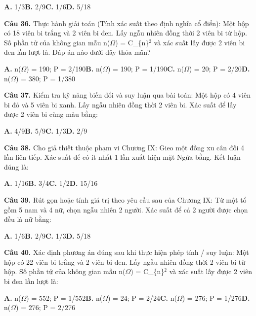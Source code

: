 \documentclass[11pt,a4paper]{article}
\begin{document}
\hspace*{1.5em}\textbf{A.} 1/3\quad\quad \textbf{B.} 2/9\quad\quad \textbf{C.} 1/6\quad\quad \textbf{D.} 5/18\par\vspace{2pt}
\textbf{\color{primary} Câu 36.} Thực hành giải toán (Tính xác suất theo định nghĩa cổ điển): Một hộp có 18 viên bi trắng và 2 viên bi đen. Lấy ngẫu nhiên đồng thời 2 viên bi từ hộp. Số phần tử của không gian mẫu n($\Omega$) = C\_\{n\}$^{2}$ và xác suất lấy được 2 viên bi đen lần lượt là. Đáp án nào dưới đây thỏa mãn?\par
\hspace*{1.5em}\textbf{A.} n($\Omega$) = 190; P = 2/190\quad\quad \textbf{B.} n($\Omega$) = 190; P = 1/190\quad\quad \textbf{C.} n($\Omega$) = 20; P = 2/20\quad\quad \textbf{D.} n($\Omega$) = 380; P = 1/380\par\vspace{2pt}
\textbf{\color{primary} Câu 37.} Kiểm tra kỹ năng biến đổi và suy luận qua bài toán: Một hộp có 4 viên bi đỏ và 5 viên bi xanh. Lấy ngẫu nhiên đồng thời 2 viên bi. Xác suất để lấy được 2 viên bi cùng màu bằng:\par
\hspace*{1.5em}\textbf{A.} 4/9\quad\quad \textbf{B.} 5/9\quad\quad \textbf{C.} 1/3\quad\quad \textbf{D.} 2/9\par\vspace{2pt}
\textbf{\color{primary} Câu 38.} Cho giả thiết thuộc phạm vi Chương IX: Gieo một đồng xu cân đối 4 lần liên tiếp. Xác suất để có ít nhất 1 lần xuất hiện mặt Ngửa bằng. Kết luận đúng là:\par
\hspace*{1.5em}\textbf{A.} 1/16\quad\quad \textbf{B.} 3/4\quad\quad \textbf{C.} 1/2\quad\quad \textbf{D.} 15/16\par\vspace{2pt}
\textbf{\color{primary} Câu 39.} Rút gọn hoặc tính giá trị theo yêu cầu sau của Chương IX: Từ một tổ gồm 5 nam và 4 nữ, chọn ngẫu nhiên 2 người. Xác suất để cả 2 người được chọn đều là nữ bằng:\par
\hspace*{1.5em}\textbf{A.} 1/6\quad\quad \textbf{B.} 2/9\quad\quad \textbf{C.} 1/3\quad\quad \textbf{D.} 5/18\par\vspace{2pt}
\textbf{\color{primary} Câu 40.} Xác định phương án đúng sau khi thực hiện phép tính / suy luận: Một hộp có 22 viên bi trắng và 2 viên bi đen. Lấy ngẫu nhiên đồng thời 2 viên bi từ hộp. Số phần tử của không gian mẫu n($\Omega$) = C\_\{n\}$^{2}$ và xác suất lấy được 2 viên bi đen lần lượt là:\par
\hspace*{1.5em}\textbf{A.} n($\Omega$) = 552; P = 1/552\quad\quad \textbf{B.} n($\Omega$) = 24; P = 2/24\quad\quad \textbf{C.} n($\Omega$) = 276; P = 1/276\quad\quad \textbf{D.} n($\Omega$) = 276; P = 2/276\par\vspace{2pt}
\end{document}

